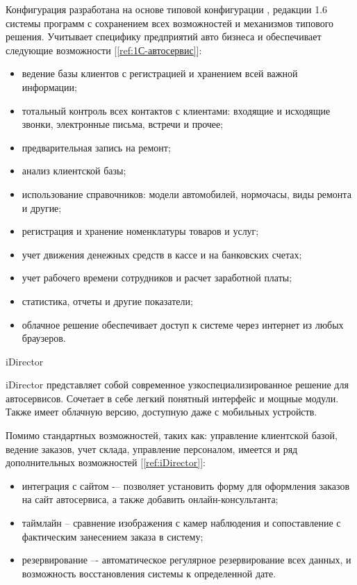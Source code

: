 Конфигурация  разработана на основе типовой конфигурации
, редакции 1.6 системы программ
 с сохранением всех возможностей и механизмов
типового решения. Учитывает специфику предприятий авто бизнеса и обеспечивает
следующие возможности [\ref{ref:1С-автосервис}]:
\begin{itemize}
	\item ведение базы клиентов с регистрацией и хранением всей важной
		информации;
	\item тотальный контроль всех контактов с клиентами: входящие и
		исходящие звонки, электронные письма, встречи и прочее;
	\item предварительная запись на ремонт;
	\item анализ клиентской базы;
	\item использование справочников: модели автомобилей, нормочасы, виды
		ремонта и другие;
	\item регистрация и хранение номенклатуры товаров и услуг;
	\item учет движения денежных средств в кассе и на банковских счетах;
	\item учет рабочего времени сотрудников и расчет заработной платы;
	\item статистика, отчеты и другие показатели;
	\item облачное решение обеспечивает доступ к системе через интернет из любых
		браузеров.
	\\[\baselineskip]
\end{itemize}


iDirector

iDirector представляет собой современное узкоспециализированное решение для
 автосервисов. Сочетает в себе легкий понятный интерфейс
и мощные модули. Также имеет облачную версию, доступную даже с мобильных
устройств.

Помимо стандартных возможностей, таких как: управление клиентской базой, ведение
заказов, учет склада, управление персоналом, имеется и ряд дополнительных
возможностей [\ref{ref:iDirector}]:
\begin{itemize}
	\item интеграция с сайтом -– позволяет установить форму для оформления
		заказов на сайт автосервиса, а также добавить онлайн-консультанта;
	\item таймлайн -- сравнение изображения с камер наблюдения и сопоставление с
		фактическим занесением заказа в систему;
	\item резервирование –- автоматическое регулярное резервирование всех
		данных, и возможность восстановления системы к определенной дате.
	\\[\baselineskip]
\end{itemize}


